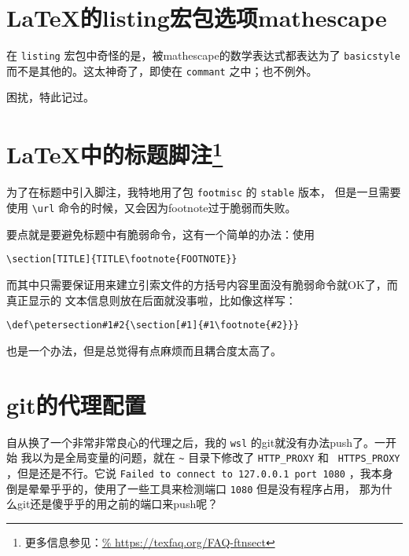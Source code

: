 
\section{\LaTeX{}的listing宏包选项mathescape}

在 \verb|listing| 宏包中奇怪的是，被mathescape的数学表达式都表达为了 \verb|basicstyle|
而不是其他的。这太神奇了，即使在 \verb|commant| 之中；也不例外。

困扰，特此记过。


\section[\LaTeX{}中的标题脚注]{\LaTeX{}中的标题脚注\footnote{更多信息参见：\url{%
https://texfaq.org/FAQ-ftnsect}}}

为了在标题中引入脚注，我特地用了包 \verb|footmisc| 的 \verb|stable| 版本，
但是一旦需要使用 \verb|\url| 命令的时候，又会因为footnote过于脆弱而失败。

要点就是要避免标题中有脆弱命令，这有一个简单的办法：使用
\begin{lstlisting}
\section[TITLE]{TITLE\footnote{FOOTNOTE}}
\end{lstlisting}

而其中只需要保证用来建立引索文件的方括号内容里面没有脆弱命令就OK了，而真正显示的
文本信息则放在后面就没事啦，比如像这样写：
\begin{lstlisting}
\def\petersection#1#2{\section[#1]{#1\footnote{#2}}}
\end{lstlisting}
也是一个办法，但是总觉得有点麻烦而且耦合度太高了。


\section{git的代理配置}

自从换了一个非常非常良心的代理之后，我的 \verb|wsl| 的git就没有办法push了。一开始
我以为是全局变量的问题，就在 \verb|~| 目录下修改了 \verb|HTTP_PROXY| 和\ %
\verb|HTTPS_PROXY| ，但是还是不行。它说 {\tt Failed to connect to 127.0.0.1 port 1080}
，我本身倒是晕晕乎乎的，使用了一些工具来检测端口 \verb|1080| 但是没有程序占用，
那为什么git还是傻乎乎的用之前的端口来push呢？

